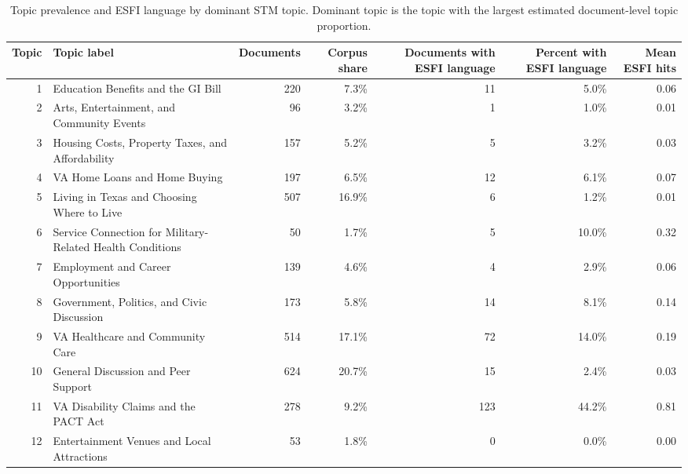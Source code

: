 \begin{table}

\caption{Topic prevalence and ESFI language by dominant STM topic. Dominant topic is the topic with the largest estimated document-level topic proportion.}
\centering
\begin{tabular}[t]{rlrrrrr}
\toprule
Topic & Topic label & Documents & Corpus share & Documents with ESFI language & Percent with ESFI language & Mean ESFI hits\\
\midrule
1 & Education Benefits and the GI Bill & 220 & 7.3\% & 11 & 5.0\% & 0.06\\
2 & Arts, Entertainment, and Community Events & 96 & 3.2\% & 1 & 1.0\% & 0.01\\
3 & Housing Costs, Property Taxes, and Affordability & 157 & 5.2\% & 5 & 3.2\% & 0.03\\
4 & VA Home Loans and Home Buying & 197 & 6.5\% & 12 & 6.1\% & 0.07\\
5 & Living in Texas and Choosing Where to Live & 507 & 16.9\% & 6 & 1.2\% & 0.01\\
6 & Service Connection for Military-Related Health Conditions & 50 & 1.7\% & 5 & 10.0\% & 0.32\\
7 & Employment and Career Opportunities & 139 & 4.6\% & 4 & 2.9\% & 0.06\\
8 & Government, Politics, and Civic Discussion & 173 & 5.8\% & 14 & 8.1\% & 0.14\\
9 & VA Healthcare and Community Care & 514 & 17.1\% & 72 & 14.0\% & 0.19\\
10 & General Discussion and Peer Support & 624 & 20.7\% & 15 & 2.4\% & 0.03\\
11 & VA Disability Claims and the PACT Act & 278 & 9.2\% & 123 & 44.2\% & 0.81\\
12 & Entertainment Venues and Local Attractions & 53 & 1.8\% & 0 & 0.0\% & 0.00\\
\bottomrule
\end{tabular}
\end{table}
